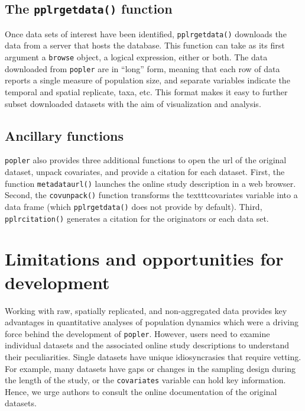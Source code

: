 \documentclass{article}\usepackage[]{graphicx}\usepackage[]{color}
\begin{document}
\subsection*{The \texttt{pplr\textunderscore get\textunderscore data()} function}

Once data sets of interest have been identified, \texttt{pplr\textunderscore get\textunderscore data()} downloads the data from a server that hosts the database. This function can take as its first argument a \texttt{browse} object, a logical expression, either or both. The data downloaded from \texttt{popler} are in ``long'' form, meaning that each row of data reports a single measure of population size, and separate variables indicate the temporal and spatial replicate, taxa, etc. This format makes it easy to further subset downloaded datasets with the aim of visualization and analysis. 

\subsection*{Ancillary functions}
\texttt{popler} also provides three additional functions to open the url of the original dataset, unpack covariates, and provide a citation for each dataset. First, the function \texttt{metadata\textunderscore url()} launches the online study description in a web browser. Second, the \texttt{cov\textunderscore unpack()} function transforms the texttt{covariates} variable into a data frame (which \texttt{pplr\textunderscore get\textunderscore data()} does not provide by default). Third, \texttt{pplr\textunderscore citation()} generates a citation for the originators or each data set. 

\section*{Limitations and opportunities for development}
Working with raw, spatially replicated, and non-aggregated data provides key advantages in quantitative analyses of population dynamics which were a driving force behind the development of \texttt{popler}. However, users need to examine individual datasets and the associated online study descriptions to understand their peculiarities. Single datasets have unique idiosyncrasies that require vetting. For example, many datasets have gaps or changes in the sampling design during the length of the study, or the  \texttt{covariates} variable can hold key information. Hence, we urge authors to consult the online documentation of the original datasets.
\end{document}
